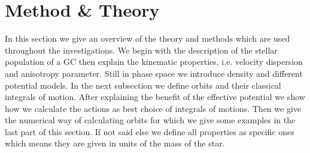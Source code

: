 \section{Method \& Theory}\label{sec:method_theory}
In this section we give an overview of the theory and methods which are used throughout the investigations. We begin with the description of the stellar population of a \ac{GC} then explain the kinematic properties, i.e. velocity dispersion and anisotropy parameter. Still in phase space we introduce density and different potential models. In the next subsection we define orbits and their classical integrals of motion. After explaining the benefit of the effective potential we show how we calculate the actions as best choice of integrals of motions. Then we give the numerical way of calculating orbits for which we give some examples in the last part of this section. If not said else we define all properties as specific ones which means they are given in units of the mass of the star.
